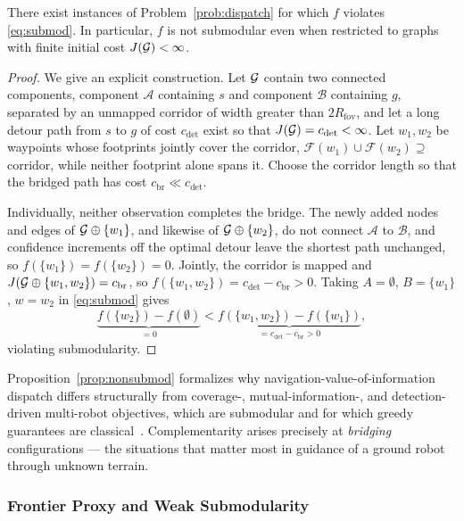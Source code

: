 \begin{proposition}
\label{prop:nonsubmod}
There exist instances of Problem~\ref{prob:dispatch} for which $f$ violates \eqref{eq:submod}. In particular, $f$ is not submodular even when restricted to graphs with finite initial cost $J(\mathcal{G}) < \infty$.
\end{proposition}

\begin{proof}
We give an explicit construction. Let $\mathcal{G}$ contain two connected components, component $\mathcal{A}$ containing $s$ and component $\mathcal{B}$ containing $g$, separated by an unmapped corridor of width greater than $2 R_{\mathrm{fov}}$, and let a long detour path from $s$ to $g$ of cost $c_{\mathrm{det}}$ exist so that $J(\mathcal{G}) = c_{\mathrm{det}} < \infty$. Let $w_1, w_2$ be waypoints whose footprints jointly cover the corridor, $\mathcal{F}(w_1) \cup \mathcal{F}(w_2) \supseteq$ corridor, while neither footprint alone spans it. Choose the corridor length so that the bridged path has cost $c_{\mathrm{br}} \ll c_{\mathrm{det}}$.

Individually, neither observation completes the bridge. The newly added nodes and edges of $\mathcal{G} \oplus \{w_1\}$, and likewise of $\mathcal{G} \oplus \{w_2\}$, do not connect $\mathcal{A}$ to $\mathcal{B}$, and confidence increments off the optimal detour leave the shortest path unchanged, so $f(\{w_1\}) = f(\{w_2\}) = 0$. Jointly, the corridor is mapped and $J(\mathcal{G} \oplus \{w_1, w_2\}) = c_{\mathrm{br}}$, so $f(\{w_1, w_2\}) = c_{\mathrm{det}} - c_{\mathrm{br}} > 0$. Taking $A = \emptyset$, $B = \{w_1\}$, $w = w_2$ in \eqref{eq:submod} gives
\[ \underbrace{f(\{w_2\}) - f(\emptyset)}_{=0} < \underbrace{f(\{w_1, w_2\}) - f(\{w_1\})}_{=c_{\mathrm{det}} - c_{\mathrm{br}} > 0}, \]
violating submodularity.
\end{proof}

\begin{remark}
Proposition~\ref{prop:nonsubmod} formalizes why navigation-value-of-information dispatch differs structurally from coverage-, mutual-information-, and detection-driven multi-robot objectives, which are submodular and for which greedy guarantees are classical~\cite{nemhauser1978,krause2014survey}. Complementarity arises precisely at \emph{bridging} configurations --- the situations that matter most in guidance of a ground robot through unknown terrain.
\end{remark}

\subsubsection{Frontier Proxy and Weak Submodularity}

